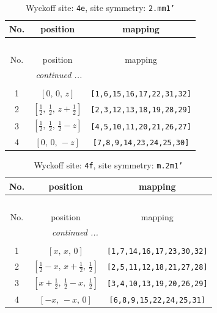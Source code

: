 \documentclass[fleqn,8pt]{jsarticle}
\begin{document}
\renewcommand{\arraystretch}{1.2}
\begin{longtable}{ccc}
\caption{Wyckoff site: {\tt 4e}, site symmetry: {\tt 2.mm1'}}
 \\
 \hline \hline
No. & position & mapping \\ \hline \endfirsthead

\multicolumn{2}{l}{\tablename\ \thetable{}} \\
 \hline \hline
No. & position & mapping \\ \hline \endhead

 \hline \hline
\multicolumn{2}{r}{\footnotesize\it continued ...} \\ \endfoot

 \hline \hline
\multicolumn{2}{r}{} \\ \endlastfoot

1 & $\left[ 0,\, 0,\, z \right]$ & {\tt [1,6,15,16,17,22,31,32]} \\ \hline
2 & $\left[ \frac{1}{2},\, \frac{1}{2},\, z + \frac{1}{2} \right]$ & {\tt [2,3,12,13,18,19,28,29]} \\ \hline
3 & $\left[ \frac{1}{2},\, \frac{1}{2},\, \frac{1}{2} - z \right]$ & {\tt [4,5,10,11,20,21,26,27]} \\ \hline
4 & $\left[ 0,\, 0,\, - z \right]$ & {\tt [7,8,9,14,23,24,25,30]} \\
\end{longtable}
\renewcommand{\arraystretch}{1.2}
\begin{longtable}{ccc}
\caption{Wyckoff site: {\tt 4f}, site symmetry: {\tt m.2m1'}}
 \\
 \hline \hline
No. & position & mapping \\ \hline \endfirsthead

\multicolumn{2}{l}{\tablename\ \thetable{}} \\
 \hline \hline
No. & position & mapping \\ \hline \endhead

 \hline \hline
\multicolumn{2}{r}{\footnotesize\it continued ...} \\ \endfoot

 \hline \hline
\multicolumn{2}{r}{} \\ \endlastfoot

1 & $\left[ x,\, x,\, 0 \right]$ & {\tt [1,7,14,16,17,23,30,32]} \\ \hline
2 & $\left[ \frac{1}{2} - x,\, x + \frac{1}{2},\, \frac{1}{2} \right]$ & {\tt [2,5,11,12,18,21,27,28]} \\ \hline
3 & $\left[ x + \frac{1}{2},\, \frac{1}{2} - x,\, \frac{1}{2} \right]$ & {\tt [3,4,10,13,19,20,26,29]} \\ \hline
4 & $\left[ - x,\, - x,\, 0 \right]$ & {\tt [6,8,9,15,22,24,25,31]} \\
\end{longtable}
\end{document}

